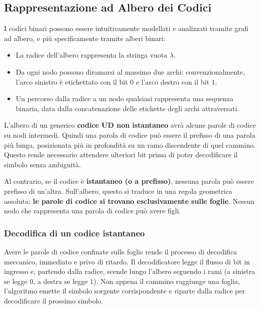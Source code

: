 \subsection{Rappresentazione ad Albero dei Codici}
I codici binari possono essere intuitivamente modellati e analizzati tramite grafi ad albero, e più specificamente tramite alberi binari:
\begin{itemize}
    \item La radice dell'albero rappresenta la stringa vuota $\lambda$.
    \item Da ogni nodo possono diramarsi al massimo due archi: convenzionalmente, l'arco sinistro è etichettato con il bit $0$ e l'arco destro con il bit $1$.
    \item Un percorso dalla radice a un nodo qualsiasi rappresenta una sequenza binaria, data dalla concatenazione delle etichette degli archi attraversati.
\end{itemize}
L'albero di un generico \textbf{codice UD non istantaneo} avrà alcune parole di codice su nodi intermedi. Quindi una parola di codice può essere il prefisso di una parola più lunga, posizionata più in profondità su un ramo discendente di quel cammino. Questo rende necessario attendere ulteriori bit prima di poter decodificare il simbolo senza ambiguità.

Al contrario, se il codice è \textbf{istantaneo (o a prefisso)}, nessuna parola può essere prefisso di un'altra. Sull'albero, questo si traduce in una regola geometrica assoluta: \textbf{le parole di codice si trovano esclusivamente sulle foglie}. Nessun nodo che rappresenta una parola di codice può avere figli.

\subsubsection{Decodifica di un codice istantaneo}
Avere le parole di codice confinate sulle foglie rende il processo di decodifica meccanico, immediato e privo di ritardo. 
Il decodificatore legge il flusso di bit in ingresso e, partendo dalla radice, scende lungo l'albero seguendo i rami (a sinistra se legge $0$, a destra se legge $1$). Non appena il cammino raggiunge una foglia, l'algoritmo emette il simbolo sorgente corrispondente e riparte dalla radice per decodificare il prossimo simbolo.


